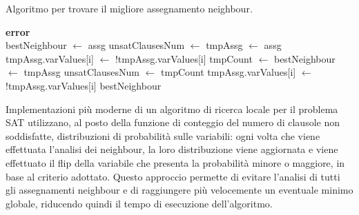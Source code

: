 \begin{algorithm}[H]
    \caption{Algoritmo per trovare il migliore assegnamento neighbour.}
    \label{alg:find_best_neighbour}
    \begin{algorithmic}[1]
                \State \textbf{error}
            \EndIf\\
            
            \State bestNeighbour $\gets$ assg
            \State unsatClausesNum $\gets$ 
            \State tmpAssg $\gets$ assg
                \State tmpAssg.varValues[i] $\gets$ !tmpAssg.varValues[i]
                \State tmpCount $\gets$ 
                    \State bestNeighbour $\gets$ tmpAssg
                    \State unsatClausesNum $\gets$ tmpCount
                \EndIf
                \State tmpAssg.varValues[i] $\gets$ !tmpAssg.varValues[i]
            \EndFor
            \State \Return bestNeighbour
        \EndProcedure
    \end{algorithmic}
\end{algorithm}
Implementazioni più moderne di un algoritmo di ricerca locale per il problema SAT utilizzano, al posto della funzione di conteggio del numero di clausole non soddisfatte, 
distribuzioni di probabilità sulle variabili: ogni volta che viene effettuata l'analisi dei neighbour, la loro distribuzione viene aggiornata e viene effettuato il flip della variabile che presenta la probabilità minore o maggiore, in base al criterio adottato.
Questo approccio permette di evitare l'analisi di tutti gli assegnamenti neighbour e di raggiungere più velocemente un eventuale minimo globale, riducendo quindi il tempo di esecuzione dell'algoritmo.

